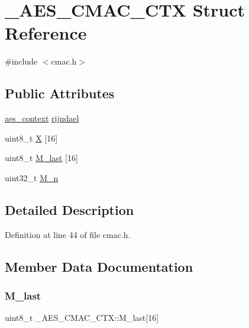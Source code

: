 \hypertarget{struct___a_e_s___c_m_a_c___c_t_x}{}\section{\+\_\+\+A\+E\+S\+\_\+\+C\+M\+A\+C\+\_\+\+C\+TX Struct Reference}
\label{struct___a_e_s___c_m_a_c___c_t_x}


{\ttfamily \#include $<$cmac.\+h$>$}

\subsection*{Public Attributes}
\begin{DoxyCompactItemize}
\item 
\mbox{\hyperlink{structaes__context}{aes\+\_\+context}} \mbox{\hyperlink{struct___a_e_s___c_m_a_c___c_t_x_a111583eab419917697a4ed96963f293c}{rijndael}}
\item 
uint8\+\_\+t \mbox{\hyperlink{struct___a_e_s___c_m_a_c___c_t_x_a3be115a420dc4da7db29666a2ca6d850}{X}} \mbox{[}16\mbox{]}
\item 
uint8\+\_\+t \mbox{\hyperlink{struct___a_e_s___c_m_a_c___c_t_x_ac2ab3afeba7a78b17fe98404b15c4ad0}{M\+\_\+last}} \mbox{[}16\mbox{]}
\item 
uint32\+\_\+t \mbox{\hyperlink{struct___a_e_s___c_m_a_c___c_t_x_a2c48607df1e9c1847d3e4ff11612124b}{M\+\_\+n}}
\end{DoxyCompactItemize}


\subsection{Detailed Description}


Definition at line 44 of file cmac.\+h.



\subsection{Member Data Documentation}
\mbox{\label{struct___a_e_s___c_m_a_c___c_t_x_ac2ab3afeba7a78b17fe98404b15c4ad0}} 
\subsubsection{\texorpdfstring{M\+\_\+last}{M\_last}}
{\footnotesize\ttfamily uint8\+\_\+t \+\_\+\+A\+E\+S\+\_\+\+C\+M\+A\+C\+\_\+\+C\+T\+X\+::\+M\+\_\+last\mbox{[}16\mbox{]}}



